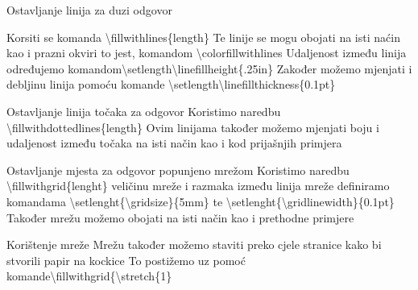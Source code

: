 \documentclass[addpoints,answers]{beamer}
\begin{document}
\begin{frame}{Ostavljanje linija za duzi odgovor}

Korsiti se komanda \color{blue}\textbackslash{fillwithlines\{length\}}\color{black}\newline\newline
Te linije se mogu obojati na isti naćin kao i prazni okviri to jest, komandom \color{blue}\textbackslash{colorfillwithlines}\color{black}
\newline
Udaljenost između linija određujemo komandom\color{blue}\textbackslash{setlength}\textbackslash{linefillheight\{.25in\}}\color{black}\newline
Zakođer možemo mjenjati i debljinu linija pomoću komande\color{blue} \textbackslash{setlength}\textbackslash{linefillthickness\{0.1pt\}}
\end{frame}

\begin{frame}{Ostavljanje linija točaka za odgovor}
Koristimo naredbu  \color{blue}\textbackslash{fillwithdottedlines\{length\}}\color{black}\newline
Ovim linijama također možemo mjenjati boju i udaljenost između točaka na isti način kao i kod prijašnjih primjera

\end{frame}

\begin{frame}{Ostavljanje mjesta za odgovor popunjeno mrežom}
Koristimo naredbu \color{blue}\textbackslash{fillwithgrid\{lenght\}}\color{black}\newline
veličinu mreže i razmaka između linija mreže definiramo komandama \color{blue}\textbackslash{setlenght\{\textbackslash{gridsize}\}\{5mm\}}\color{black} te \color{blue}\textbackslash{setlenght\{\textbackslash{gridlinewidth}\}\{0.1pt\}}\color{black}
\newline
Također mrežu možemo obojati na isti način kao i prethodne primjere

\end{frame}
\begin{frame}{Korištenje mreže}
Mrežu također možemo staviti preko cjele stranice kako bi stvorili papir na kockice
\newline
To postižemo uz pomoć komande\color{blue}\textbackslash{fillwithgrid\{\textbackslash{stretch\{1\}}}
\end{frame}




%
%	
%
%

\begin{frame}

\end{frame}
\end{document}
